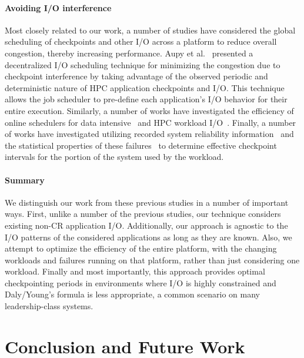 \documentclass[two]{article}
\begin{document}
\paragraph*{Avoiding I/O interference}

Most closely related to our work, a number of studies have considered the global
scheduling of checkpoints and other I/O across a platform to reduce overall
congestion, thereby increasing performance.  Aupy et al.~\cite{Aupy:2017:Periodic}
presented a decentralized I/O scheduling technique for minimizing the congestion due
to checkpoint interference by taking advantage of the observed periodic and
deterministic nature of HPC application checkpoints and I/O.  This technique allows
the job scheduler to pre-define each application’s I/O behavior for their entire
execution.  Similarly, a number of works have investigated the efficiency of online
schedulers for data intensive~\cite{Groot2013,Sim:2015:AnalyzeThis} and HPC workload
I/O~\cite{Dorier2015,Gainaru:2016:Scheduling,Zhou:2015:IOAware,Herbein2017}.
Finally, a number of works have investigated utilizing recorded system reliability
information~\cite{Oliner:2006:Cooperative} and the statistical properties of these
failures~\cite{Tiwari:2014:Lazy} to determine effective checkpoint intervals for the
portion of the system used by the workload.

\paragraph*{Summary}

We distinguish our work from these previous studies in a number of important ways.
First, unlike a number of the previous studies, our technique considers existing
non-CR application I/O. Additionally, our approach is agnostic to the I/O patterns of
the considered applications as long as they are known.  Also, we attempt to optimize
the efficiency of the entire platform, with the changing workloads and failures
running on that platform, rather than just considering one workload. Finally and most
importantly, this approach provides optimal checkpointing periods in environments
where I/O is highly constrained and Daly/Young's formula is less appropriate, a common
scenario on many leadership-class systems.


%
\section{Conclusion and Future Work} \label{sec:conclusion}
\end{document}

